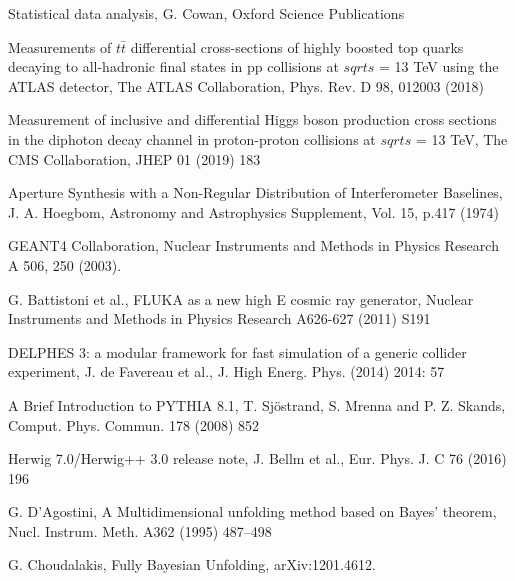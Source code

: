 \documentclass{article}
\begin{document}
\begin{thebibliography}{99}

 Statistical data analysis, G. Cowan, Oxford Science Publications

 Measurements of $t\bar{t}$ differential cross-sections of highly boosted top quarks decaying to all-hadronic final states in pp collisions at $sqrt{s}$ = 13 TeV using the ATLAS detector, The ATLAS Collaboration, Phys. Rev. D 98, 012003 (2018)

 Measurement of inclusive and differential Higgs boson production cross sections in the diphoton decay channel in proton-proton collisions at $sqrt{s}$ = 13 TeV, The CMS Collaboration, JHEP 01 (2019) 183

  Aperture Synthesis with a Non-Regular Distribution of Interferometer Baselines, J. A. Hoegbom, Astronomy and Astrophysics Supplement, Vol. 15, p.417 (1974)

 GEANT4 Collaboration, Nuclear Instruments and Methods in Physics Research A 506, 250 (2003).

 G. Battistoni et al., FLUKA as a new high E cosmic ray generator, Nuclear Instruments and Methods in Physics Research A626-627 (2011) S191 

 DELPHES 3: a modular framework for fast simulation of a generic collider experiment, J. de Favereau et al., J. High Energ. Phys. (2014) 2014: 57

 A Brief Introduction to PYTHIA 8.1, T. Sj\"ostrand, S. Mrenna and P. Z. Skands, Comput. Phys. Commun. 178 (2008) 852

 Herwig 7.0/Herwig++ 3.0 release note, J. Bellm et al., Eur. Phys. J. C 76 (2016) 196

 G. D’Agostini, A Multidimensional unfolding method based on Bayes’ theorem, Nucl. Instrum. Meth. A362 (1995) 487–498

 G. Choudalakis, Fully Bayesian Unfolding, arXiv:1201.4612.

\end{thebibliography}
\end{document}
